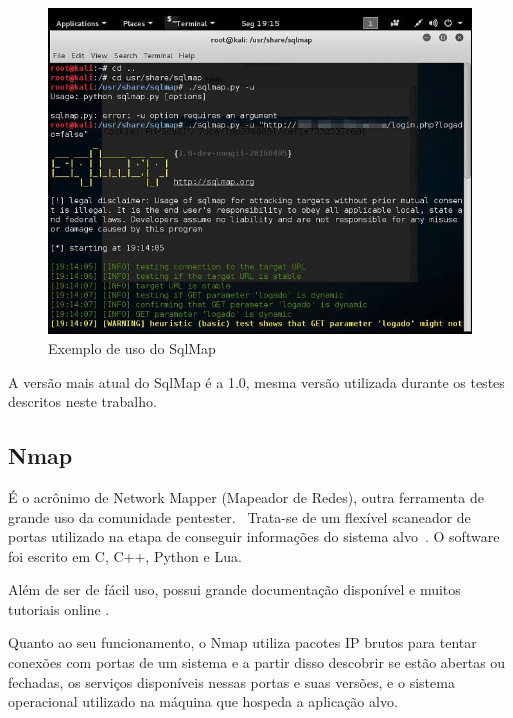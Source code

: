 \documentclass[
    12pt,               %
    openright,          %
    oneside,            %
    a4paper,            %
    section=TITLE,     %
    english,            %
    french,             %
    spanish,            %
    brazil              %
    ]{abntex2}
\newcommand{\citep}{\cite}
\begin{document}
\begin{figure}[htp]
\centering
\caption{Exemplo de uso do SqlMap}
\includegraphics[width=460px]{image12.jpeg}
\end{figure}
\ifdefined\FloatBarrier \FloatBarrier \fi


A versão mais atual do SqlMap é a 1.0, mesma versão utilizada durante os testes descritos neste trabalho.



\subsection*{Nmap}

É o acrônimo de Network Mapper (Mapeador de Redes), outra ferramenta de grande uso da comunidade pentester.~ Trata-se de um flexível scaneador de portas utilizado na etapa de conseguir informações do sistema alvo~. O software foi escrito em C, C++, Python e Lua.


Além de ser de fácil uso, possui grande documentação disponível e muitos tutoriais online \citep{62223}.


Quanto ao seu funcionamento, o Nmap utiliza pacotes IP brutos para tentar conexões com portas de um sistema e a partir disso descobrir se estão abertas ou fechadas, os serviços disponíveis nessas portas e suas versões, e o sistema operacional utilizado na máquina que hospeda a aplicação alvo.
\end{document}
